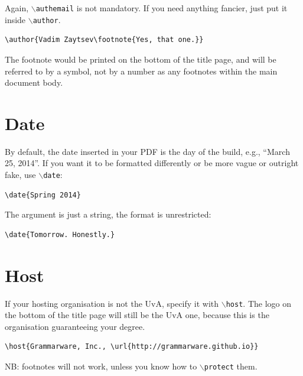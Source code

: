 \documentclass{uvamscse}
\newcommand{\cmd}[1]{\texttt{$\backslash$#1}}
\begin{document}
Again, \cmd{authemail} is not mandatory. If you need anything fancier, just put it inside \cmd{author}.

\begin{snippet}
\begin{verbatim}
\author{Vadim Zaytsev\footnote{Yes, that one.}}
\end{verbatim}
\end{snippet}

The footnote would be printed on the bottom of the title page, and will be
referred to by a symbol, not by a number as any footnotes within the main
document body.

\section{Date}

By default, the date inserted in your PDF is the day of the build, e.g., ``March 25, 2014''. If you want it to be formatted differently or be more vague or outright fake, use \cmd{date}:

\begin{snippet}
\begin{verbatim}
\date{Spring 2014}
\end{verbatim}
\end{snippet}

The argument is just a string, the format is unrestricted:

\begin{snippet}
\begin{verbatim}
\date{Tomorrow. Honestly.}
\end{verbatim}
\end{snippet}

\section{Host}

If your hosting organisation is not the UvA, specify it with \cmd{host}. The
logo on the bottom of the title page will still be the UvA one, because this
is the organisation guaranteeing your degree.

\begin{snippet}
\begin{verbatim}
\host{Grammarware, Inc., \url{http://grammarware.github.io}}
\end{verbatim}
\end{snippet}

NB: footnotes will not work, unless you know how to \cmd{protect} them.
\end{document}
